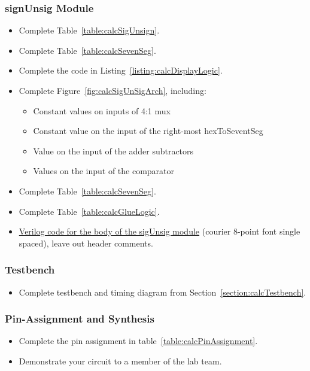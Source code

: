     \subsubsection{signUnsig Module}

    \begin{itemize}
        \item
            Complete Table~\ref{table:calcSigUnsign}.
        \item
            Complete Table~\ref{table:calcSevenSeg}.
        \item
            Complete the code in Listing~\ref{listing:calcDisplayLogic}.
        \item
            Complete Figure~\ref{fig:calcSigUnSigArch}, including:

            \begin{itemize}
                \item
                    Constant values on inputs of 4:1 mux
                \item
                    Constant value on the input of the right-most hexToSeventSeg
                \item
                    Value on the input of the adder subtractors
                \item
                    Values on the input of the comparator
            \end{itemize}
        \item
            Complete Table~\ref{table:calcSevenSeg}.
        \item
            Complete Table~\ref{table:calcGlueLogic}.
        \item
            \protect\hyperlink{sigUnsign_Verilog}{Verilog code for the body of the
            sigUnsig module} (courier 8-point font single spaced), leave out
            header comments.
    \end{itemize}

    \subsubsection{Testbench}
    \begin{itemize}
        \item Complete testbench and timing diagram from Section~\ref{section:calcTestbench}.
    \end{itemize}

    \subsubsection{Pin-Assignment and Synthesis}
    \begin{itemize}
        \item Complete the pin assignment in table~\ref{table:calcPinAssignment}.
        \item Demonstrate your circuit to a member of the lab team.
    \end{itemize}

